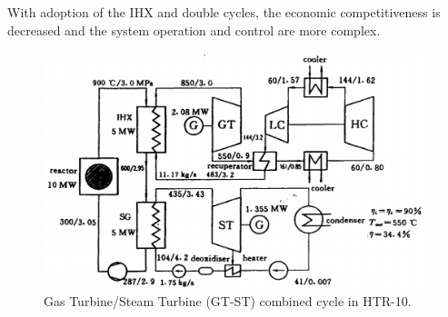 \documentclass[11pt,letterpaper]{article}
\begin{document}
With adoption of the IHX and double cycles, the economic competitiveness is decreased and the system operation and control are more complex.

\cite{yuanhui_htgr_1996}

\begin{figure}[H]
	\centering
	\includegraphics[width=0.4\linewidth]{figures/htgr-gtst.png}
	\hfill
	\caption{Gas Turbine/Steam Turbine (GT-ST) combined cycle in HTR-10.}
	\label{fig:gtst}
\end{figure}

\pagebreak


\end{document}
